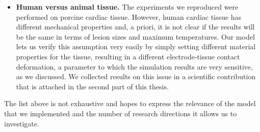 \begin{itemize}
  \item \textbf{Human versus animal tissue.} The experiments we reproduced were performed on porcine cardiac tissue. However, human cardiac tissue has different mechanical properties and, a priori, it is not clear if the results will be the same in terms of lesion sizes and maximum temperatures. Our model lets us verify this assumption very easily by simply setting different material properties for the tissue, resulting in a different electrode-tissue contact deformation, a parameter to which the simulation results are very sensitive, as we discussed. We collected results on this issue in a scientific contribution that is attached in the second part of this thesis.
\end{itemize}

The list above is not exhaustive and hopes to express the relevance of the model that we implemented and the number of research directions it allows us to investigate.

